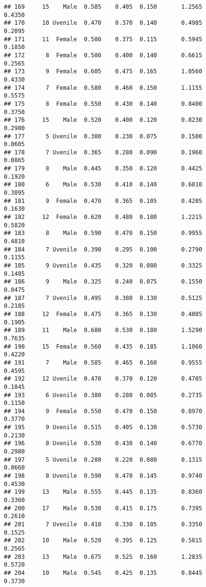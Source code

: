 \documentclass[
]{article}
\begin{document}
\begin{verbatim}
## 169     15    Male  0.585    0.405  0.150       1.2565         0.4350
## 170     10 Uvenile  0.470    0.370  0.140       0.4985         0.2095
## 171     11  Female  0.500    0.375  0.115       0.5945         0.1850
## 172      8  Female  0.500    0.400  0.140       0.6615         0.2565
## 173      9  Female  0.605    0.475  0.165       1.0560         0.4330
## 174      7  Female  0.580    0.460  0.150       1.1155         0.5575
## 175      8  Female  0.550    0.430  0.140       0.8400         0.3750
## 176     15    Male  0.520    0.400  0.120       0.8230         0.2980
## 177      5 Uvenile  0.300    0.230  0.075       0.1500         0.0605
## 178      7 Uvenile  0.365    0.280  0.090       0.1960         0.0865
## 179      8    Male  0.445    0.350  0.120       0.4425         0.1920
## 180      6    Male  0.530    0.410  0.140       0.6810         0.3095
## 181      9  Female  0.470    0.365  0.105       0.4205         0.1630
## 182     12  Female  0.620    0.480  0.180       1.2215         0.5820
## 183      8    Male  0.590    0.470  0.150       0.9955         0.4810
## 184      7 Uvenile  0.390    0.295  0.100       0.2790         0.1155
## 185      9 Uvenile  0.435    0.320  0.080       0.3325         0.1485
## 186      9    Male  0.325    0.240  0.075       0.1550         0.0475
## 187      7 Uvenile  0.495    0.380  0.130       0.5125         0.2185
## 188     12  Female  0.475    0.365  0.130       0.4805         0.1905
## 189     11    Male  0.680    0.530  0.180       1.5290         0.7635
## 190     15  Female  0.560    0.435  0.185       1.1060         0.4220
## 191      7    Male  0.585    0.465  0.160       0.9555         0.4595
## 192     12 Uvenile  0.470    0.370  0.120       0.4705         0.1845
## 193      6 Uvenile  0.380    0.280  0.085       0.2735         0.1150
## 194      9  Female  0.550    0.470  0.150       0.8970         0.3770
## 195      9 Uvenile  0.515    0.405  0.130       0.5730         0.2130
## 196      8 Uvenile  0.530    0.430  0.140       0.6770         0.2980
## 197      5 Uvenile  0.280    0.220  0.080       0.1315         0.0660
## 198      8 Uvenile  0.590    0.470  0.145       0.9740         0.4530
## 199     13    Male  0.555    0.445  0.135       0.8360         0.3360
## 200     17    Male  0.530    0.415  0.175       0.7395         0.2610
## 201      7 Uvenile  0.410    0.330  0.105       0.3350         0.1525
## 202     10    Male  0.520    0.395  0.125       0.5815         0.2565
## 203     13    Male  0.675    0.525  0.160       1.2835         0.5720
## 204     10    Male  0.545    0.425  0.135       0.8445         0.3730

\end{verbatim}
\end{document}
